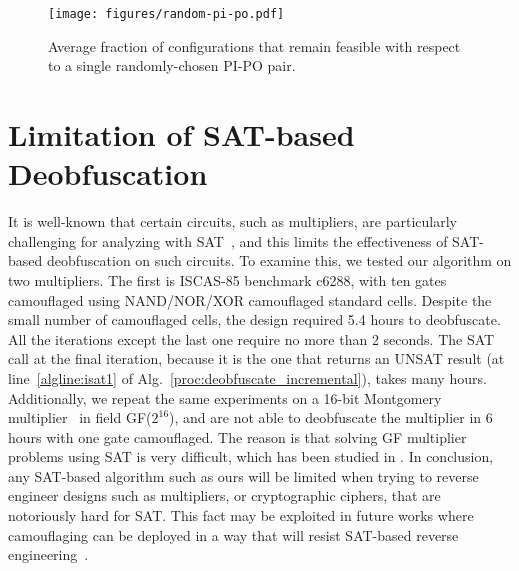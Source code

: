 \documentclass[proposal]{umassthesis}  %
\begin{document}
\begin{figure}[!hbt]
 \centering
 \texttt{[image: figures/random-pi-po.pdf]}
   \caption{Average fraction of configurations that remain feasible with respect to a single randomly-chosen PI-PO pair.}
    \vspace{-2mm}
    \label{fig:random_pi_po_test}
\end{figure}










\section{Limitation of SAT-based Deobfuscation}

It is well-known that certain circuits, such as multipliers, are particularly challenging for analyzing with SAT~\cite{cook1997finding}, and this limits the effectiveness of SAT-based deobfuscation on such circuits. To examine this, we tested our algorithm on two multipliers. The first is ISCAS-85 benchmark c6288, with ten gates camouflaged using NAND/NOR/XOR camouflaged standard cells. Despite the small number of camouflaged cells, the design required 5.4 hours to deobfuscate. All the iterations except the last one require no more than 2 seconds. The SAT call at the final iteration, because it is the one that returns an UNSAT result (at line~\ref{algline:isat1} of Alg.~\ref{proc:deobfuscate_incremental}), takes many hours. Additionally, we repeat the same experiments on a 16-bit Montgomery multiplier~\cite{koc1998montgomery} in field GF($2^{16}$), and are not able to deobfuscate the multiplier in 6 hours with one gate camouflaged. The reason is that solving GF multiplier problems using SAT is very difficult, which has been studied in \cite{lv2012efficient}. In conclusion, any SAT-based algorithm such as ours will be limited when trying to reverse engineer designs such as multipliers, or cryptographic ciphers, that are notoriously hard for SAT. This fact may be exploited in future works where camouflaging can be deployed in a way that will resist SAT-based reverse engineering~\cite{yasin-15}.
\end{document}
